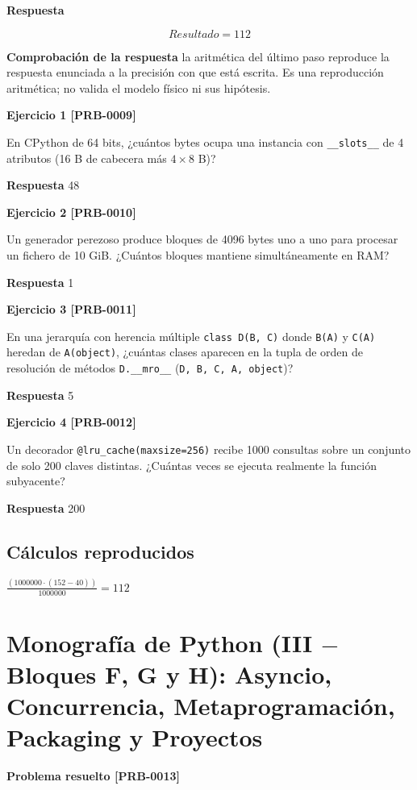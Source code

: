 \documentclass{book}
\begin{document}
\noindent\textbf{Respuesta}

\[
Resultado = 112
\]

\noindent\textbf{Comprobación de la respuesta} la aritmética del último paso reproduce la respuesta enunciada a la precisión con que está escrita. Es una reproducción aritmética; no valida el modelo físico ni sus hipótesis.

\noindent\textbf{Ejercicio 1 [PRB-0009]}

En CPython de 64 bits, ¿cuántos bytes ocupa una instancia con \texttt{\_\_slots\_\_} de 4 atributos (16 B de cabecera más \(4 \times 8\) B)?

\noindent\textbf{Respuesta} 48

\noindent\textbf{Ejercicio 2 [PRB-0010]}

Un generador perezoso produce bloques de 4096 bytes uno a uno para procesar un fichero de 10 GiB. ¿Cuántos bloques mantiene simultáneamente en RAM?

\noindent\textbf{Respuesta} 1

\noindent\textbf{Ejercicio 3 [PRB-0011]}

En una jerarquía con herencia múltiple \texttt{class D(B, C)} donde \texttt{B(A)} y \texttt{C(A)} heredan de \texttt{A(object)}, ¿cuántas clases aparecen en la tupla de orden de resolución de métodos \texttt{D.\_\_mro\_\_} (\texttt{D, B, C, A, object})?

\noindent\textbf{Respuesta} 5

\noindent\textbf{Ejercicio 4 [PRB-0012]}

Un decorador \texttt{@lru\_cache(maxsize=256)} recibe 1000 consultas sobre un conjunto de solo 200 claves distintas. ¿Cuántas veces se ejecuta realmente la función subyacente?

\noindent\textbf{Respuesta} 200

\subsection*{Cálculos reproducidos}

\(\frac{\left(1000000\cdot \left(152-40\right)\right)}{1000000} = 112\)

\section{Monografía de Python (III \(-\) Bloques F, G y H): Asyncio, Concurrencia, Metaprogramación, Packaging y Proyectos}

\noindent\textbf{Problema resuelto [PRB-0013]}
\end{document}
